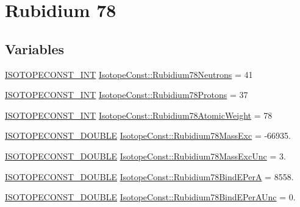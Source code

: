 \hypertarget{group___isotope_const-_rubidium-_rb78}{}\section{Rubidium 78}
\label{group___isotope_const-_rubidium-_rb78}
\subsection*{Variables}
\begin{DoxyCompactItemize}
\item 
\mbox{\hyperlink{group___isotope_const-_macros_ga5f18360b3e99483a35c32d789e62621c}{I\+S\+O\+T\+O\+P\+E\+C\+O\+N\+S\+T\+\_\+\+I\+NT}} \mbox{\hyperlink{group___isotope_const-_rubidium-_rb78_gaa26397df958af5b9b82309b3c0aa3f19}{Isotope\+Const\+::\+Rubidium78\+Neutrons}} = 41
\item 
\mbox{\hyperlink{group___isotope_const-_macros_ga5f18360b3e99483a35c32d789e62621c}{I\+S\+O\+T\+O\+P\+E\+C\+O\+N\+S\+T\+\_\+\+I\+NT}} \mbox{\hyperlink{group___isotope_const-_rubidium-_rb78_ga9feeccd6e1f3205b7519e7318a9b8d6e}{Isotope\+Const\+::\+Rubidium78\+Protons}} = 37
\item 
\mbox{\hyperlink{group___isotope_const-_macros_ga5f18360b3e99483a35c32d789e62621c}{I\+S\+O\+T\+O\+P\+E\+C\+O\+N\+S\+T\+\_\+\+I\+NT}} \mbox{\hyperlink{group___isotope_const-_rubidium-_rb78_gae0c80a3354ed463bb1baadc123e17f61}{Isotope\+Const\+::\+Rubidium78\+Atomic\+Weight}} = 78
\item 
\mbox{\hyperlink{group___isotope_const-_macros_ga8f45a7272ce02c0b4c65c44636ed719a}{I\+S\+O\+T\+O\+P\+E\+C\+O\+N\+S\+T\+\_\+\+D\+O\+U\+B\+LE}} \mbox{\hyperlink{group___isotope_const-_rubidium-_rb78_ga7f8d7f4d823bfd4e6a9c502d1a0e5bad}{Isotope\+Const\+::\+Rubidium78\+Mass\+Exc}} = -\/66935.
\item 
\mbox{\hyperlink{group___isotope_const-_macros_ga8f45a7272ce02c0b4c65c44636ed719a}{I\+S\+O\+T\+O\+P\+E\+C\+O\+N\+S\+T\+\_\+\+D\+O\+U\+B\+LE}} \mbox{\hyperlink{group___isotope_const-_rubidium-_rb78_ga4df537eff1e75f47ed877a961d50920a}{Isotope\+Const\+::\+Rubidium78\+Mass\+Exc\+Unc}} = 3.
\item 
\mbox{\hyperlink{group___isotope_const-_macros_ga8f45a7272ce02c0b4c65c44636ed719a}{I\+S\+O\+T\+O\+P\+E\+C\+O\+N\+S\+T\+\_\+\+D\+O\+U\+B\+LE}} \mbox{\hyperlink{group___isotope_const-_rubidium-_rb78_gace8bbc7270f17354f06dcd0d9093a953}{Isotope\+Const\+::\+Rubidium78\+Bind\+E\+PerA}} = 8558.
\item 
\mbox{\hyperlink{group___isotope_const-_macros_ga8f45a7272ce02c0b4c65c44636ed719a}{I\+S\+O\+T\+O\+P\+E\+C\+O\+N\+S\+T\+\_\+\+D\+O\+U\+B\+LE}} \mbox{\hyperlink{group___isotope_const-_rubidium-_rb78_ga05ba0215c20f24b3bb907d8787b592e3}{Isotope\+Const\+::\+Rubidium78\+Bind\+E\+Per\+A\+Unc}} = 0.

\end{DoxyCompactItemize}
